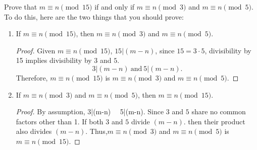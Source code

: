Prove that \(m\equiv n \pmod{15}\) if and only if \(m\equiv n \pmod{3}\) and \(m\equiv n \pmod{5}\). To do this, here are the two things that you should prove:
\begin{enumerate}
\item[(a)] If \(m\equiv n \pmod{15}\), then \(m\equiv n \pmod{3}\) and \(m\equiv n \pmod{5}\).
\begin{proof}
    Given \(m\equiv n \pmod{15}\), \(15|(m-n)\), since \(15=3 \cdot 5\), divisibility by 15 implies divisibility by \(3\) and \(5\).
    \[
    3|(m-n) \ \text{and}\ 5|(m-n).
    \]
    Therefore, \(m\equiv n \pmod{15}\) is \(m\equiv n \pmod{3}\) and \(m\equiv n \pmod{5}\).
\end{proof}
\item[(b)] If \(m\equiv n \pmod{3}\) and \(m\equiv n \pmod{5}\), then \(m\equiv n \pmod{15}\).
\begin{proof}
    By assumption,  3|(m-n) \ \ 5|(m-n). Since  \(3\) and \(5\) share no common factors other than 1. If both  \(3\) and \(5\) divide \((m-n)\). then their product also divides \((m-n)\). Thus,\(m\equiv n \pmod{3}\) and \(m\equiv n \pmod{5}\) is \(m\equiv n \pmod{15}\).
\end{proof}
\end{enumerate}
